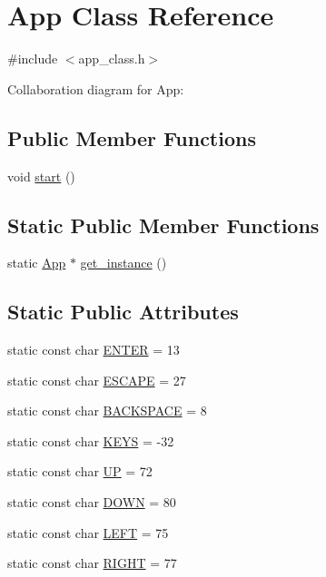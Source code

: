 \hypertarget{class_app}{}\section{App Class Reference}
\label{class_app}


{\ttfamily \#include $<$app\+\_\+class.\+h$>$}



Collaboration diagram for App\+:
\subsection*{Public Member Functions}
\begin{DoxyCompactItemize}
\item 
void \mbox{\hyperlink{class_app_a45e80958bad2ae75a2a152028a66021c}{start}} ()
\end{DoxyCompactItemize}
\subsection*{Static Public Member Functions}
\begin{DoxyCompactItemize}
\item 
static \mbox{\hyperlink{class_app}{App}} $\ast$ \mbox{\hyperlink{class_app_a86156f6cee97b06d3ab6ca6e47ea64e4}{get\+\_\+instance}} ()
\end{DoxyCompactItemize}
\subsection*{Static Public Attributes}
\begin{DoxyCompactItemize}
\item 
static const char \mbox{\hyperlink{class_app_a88020cfd8e00657603c42f14fc139c25}{E\+N\+T\+ER}} = 13
\item 
static const char \mbox{\hyperlink{class_app_a61ecc473b24d6804236f06ddffaa3237}{E\+S\+C\+A\+PE}} = 27
\item 
static const char \mbox{\hyperlink{class_app_ad55056834cf494ee266b3cc6fa53e6d5}{B\+A\+C\+K\+S\+P\+A\+CE}} = 8
\item 
static const char \mbox{\hyperlink{class_app_a563011e37722e8a06a5d2c7a8c225804}{K\+E\+YS}} = -\/32
\item 
static const char \mbox{\hyperlink{class_app_a3c5ab3c77f7f03e811b2542106943844}{UP}} = 72
\item 
static const char \mbox{\hyperlink{class_app_a181d1f6b8675c1c8f198bb300f335f9c}{D\+O\+WN}} = 80
\item 
static const char \mbox{\hyperlink{class_app_a67580d6b022f20dcd164d2ed7c969606}{L\+E\+FT}} = 75
\item 
static const char \mbox{\hyperlink{class_app_a25eefcb83101cb10090acee7487276bb}{R\+I\+G\+HT}} = 77
\end{DoxyCompactItemize}


